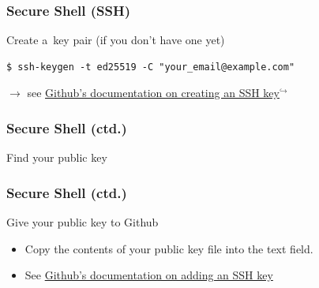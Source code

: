 \documentclass[12pt]{beamer}
\begin{document}
\begin{frame}[fragile]
  \frametitle{Secure Shell (SSH)}

  \begin{block}{Create a~key pair (if you don't have one yet)}
    {\footnotesize{}%
      \begin{verbatim}
$ ssh-keygen -t ed25519 -C "your_email@example.com"
      \end{verbatim}
    }
    $\to$ see \href{https://docs.github.com/en/github/authenticating-to-github/connecting-to-github-with-ssh/generating-a-new-ssh-key-and-adding-it-to-the-ssh-agent#adding-your-ssh-key-to-the-ssh-agent}%
    {Github's documentation on creating an SSH key$^{\hookrightarrow}$}
  \end{block}

\end{frame}

\begin{frame}
  \frametitle{Secure Shell (ctd.)}

  \begin{block}{Find your public key}
  \end{block}
\end{frame}

\begin{frame}
  \frametitle{Secure Shell (ctd.)}

  \begin{block}{Give your public key to Github}
    \begin{itemize}
      \item Copy the contents of your public key file into the text field.
      \item See \href{https://docs.github.com/en/github/authenticating-to-github/connecting-to-github-with-ssh/adding-a-new-ssh-key-to-your-github-account}%
    {Github's documentation on adding an SSH key}
    \end{itemize}
  \end{block}
\end{frame}
\end{document}
